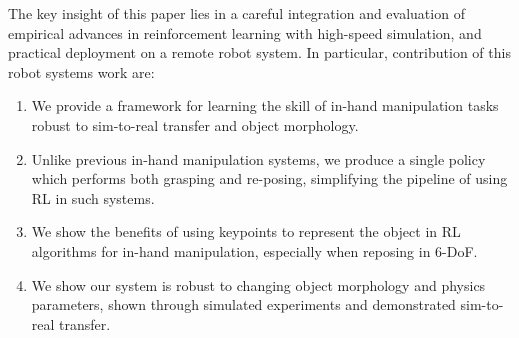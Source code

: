 \documentclass[letterpaper, 10 pt, conference]{ieeeconf}  %
\begin{document}
The key insight of this paper lies in a careful integration and evaluation of empirical advances in reinforcement learning with high-speed simulation, and practical deployment on a remote robot system. 
In particular, contribution of this robot systems work are:
\begin{enumerate}[noitemsep,topsep=0pt,leftmargin=1em]
    \item We provide a framework for learning the skill of in-hand manipulation tasks robust to sim-to-real transfer and object morphology.
    \item Unlike previous in-hand manipulation systems, we produce a single policy which performs both grasping and re-posing, simplifying the pipeline of using RL in such systems.
    \item  We show the benefits of using keypoints to represent the object in RL algorithms for in-hand manipulation, especially when reposing in 6-DoF.
    \item We show our system is robust to changing object morphology and physics parameters, shown through simulated experiments and demonstrated sim-to-real transfer.
    
\end{enumerate}



\end{document}
